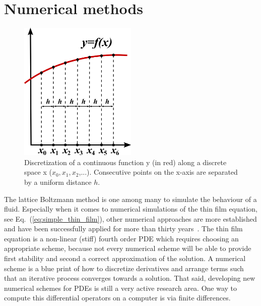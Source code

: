 \section{Numerical methods}
\label{sec:numerical_methods}
\begin{figure}
    \centering
    \includegraphics[width=0.5\textwidth]{graphics/800px-Finite_Differences.svg.png}
    \caption{Discretization of a continuous function y (in red) along a discrete space x ($x_0, x_1, x_2$,...).
    Consecutive points on the x-axis are separated by a uniform distance $h$.
    }
    \label{fig:finite_difference}
\end{figure}
The lattice Boltzmann method is one among many to simulate the behaviour of a fluid.
Especially when it comes to numerical simulations of the thin film equation, see Eq.~(\ref{eq:simple_thin_film}), other numerical approaches are more established and have been successfully applied for more than thirty years~\cite{beckerComplexDewettingScenarios2003, peschkaSignaturesSlipDewetting2019, davidovitchSpreadingViscousFluid2005, meckeThermalFluctuationsThin2005, diezGlobalModelsMoving2000, schwartzSimulationDropletMotion1998}.
The thin film equation is a non-linear (stiff) fourth order PDE which requires choosing an appropriate scheme, because not every numerical scheme will be able to provide first stability and second a correct approximation of the solution.
A numerical scheme is a blue print of how to discretize derivatives and arrange terms such that an iterative process converges towards a solution.
That said, developing new numerical schemes for PDEs is still a very active research area.
One way to compute this differential operators on a computer is via finite differences.

